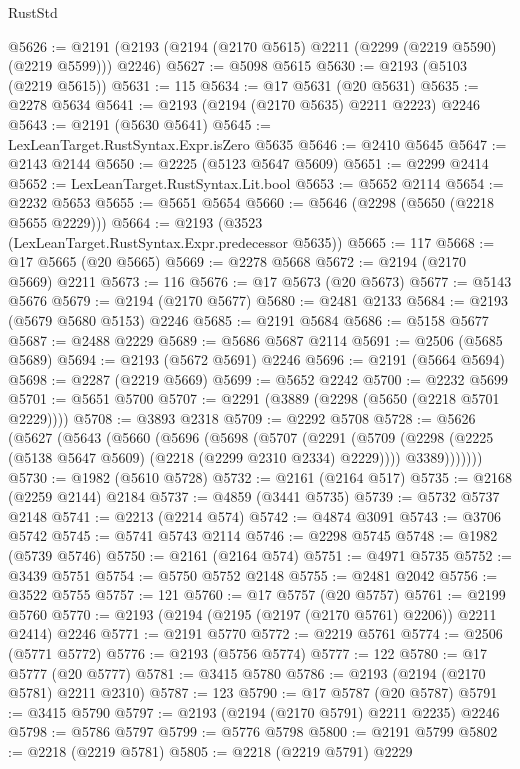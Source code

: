 \begin{lexlean}{RustStd}
\begin{coremodule}
{\begin{coremodule}
{{{{{{{{{{{{{{{{{{{{{{{{{{@5626 := @2191 (@2193 (@2194 (@2170 @5615) @2211 (@2299 (@2219 @5590) (@2219 @5599))) @2246)
@5627 := @5098 @5615
@5630 := @2193 (@5103 (@2219 @5615))
@5631 := 115
@5634 := @17 @5631 (@20 @5631)
@5635 := @2278 @5634
@5641 := @2193 (@2194 (@2170 @5635) @2211 @2223) @2246
@5643 := @2191 (@5630 @5641)
@5645 := LexLeanTarget.RustSyntax.Expr.isZero @5635
@5646 := @2410 @5645
@5647 := @2143 @2144
@5650 := @2225 (@5123 @5647 @5609)
@5651 := @2299 @2414
@5652 := LexLeanTarget.RustSyntax.Lit.bool
@5653 := @5652 @2114
@5654 := @2232 @5653
@5655 := @5651 @5654
@5660 := @5646 (@2298 (@5650 (@2218 @5655 @2229)))
@5664 := @2193 (@3523 (LexLeanTarget.RustSyntax.Expr.predecessor @5635))
@5665 := 117
@5668 := @17 @5665 (@20 @5665)
@5669 := @2278 @5668
@5672 := @2194 (@2170 @5669) @2211
@5673 := 116
@5676 := @17 @5673 (@20 @5673)
@5677 := @5143 @5676
@5679 := @2194 (@2170 @5677)
@5680 := @2481 @2133
@5684 := @2193 (@5679 @5680 @5153) @2246
@5685 := @2191 @5684
@5686 := @5158 @5677
@5687 := @2488 @2229
@5689 := @5686 @5687 @2114
@5691 := @2506 (@5685 @5689)
@5694 := @2193 (@5672 @5691) @2246
@5696 := @2191 (@5664 @5694)
@5698 := @2287 (@2219 @5669)
@5699 := @5652 @2242
@5700 := @2232 @5699
@5701 := @5651 @5700
@5707 := @2291 (@3889 (@2298 (@5650 (@2218 @5701 @2229))))
@5708 := @3893 @2318
@5709 := @2292 @5708
@5728 := @5626
    (@5627
      (@5643
        (@5660
          (@5696
            (@5698
              (@5707
                (@2291
                  (@5709 (@2298 (@2225 (@5138 @5647 @5609) (@2218 (@2299 @2310 @2334) @2229))))
                  @3389)))))))
@5730 := @1982 (@5610 @5728)
@5732 := @2161 (@2164 @517)
@5735 := @2168 (@2259 @2144) @2184
@5737 := @4859 (@3441 @5735)
@5739 := @5732 @5737 @2148
@5741 := @2213 (@2214 @574)
@5742 := @4874 @3091
@5743 := @3706 @5742
@5745 := @5741 @5743 @2114
@5746 := @2298 @5745
@5748 := @1982 (@5739 @5746)
@5750 := @2161 (@2164 @574)
@5751 := @4971 @5735
@5752 := @3439 @5751
@5754 := @5750 @5752 @2148
@5755 := @2481 @2042
@5756 := @3522 @5755
@5757 := 121
@5760 := @17 @5757 (@20 @5757)
@5761 := @2199 @5760
@5770 := @2193 (@2194 (@2195 (@2197 (@2170 @5761) @2206)) @2211 @2414) @2246
@5771 := @2191 @5770
@5772 := @2219 @5761
@5774 := @2506 (@5771 @5772)
@5776 := @2193 (@5756 @5774)
@5777 := 122
@5780 := @17 @5777 (@20 @5777)
@5781 := @3415 @5780
@5786 := @2193 (@2194 (@2170 @5781) @2211 @2310)
@5787 := 123
@5790 := @17 @5787 (@20 @5787)
@5791 := @3415 @5790
@5797 := @2193 (@2194 (@2170 @5791) @2211 @2235) @2246
@5798 := @5786 @5797
@5799 := @5776 @5798
@5800 := @2191 @5799
@5802 := @2218 (@2219 @5781)
@5805 := @2218 (@2219 @5791) @2229
}}}}}}}}}}}}}}}}}}}}}}}}}}
\end{coremodule}}
\end{coremodule}
\end{lexlean}
